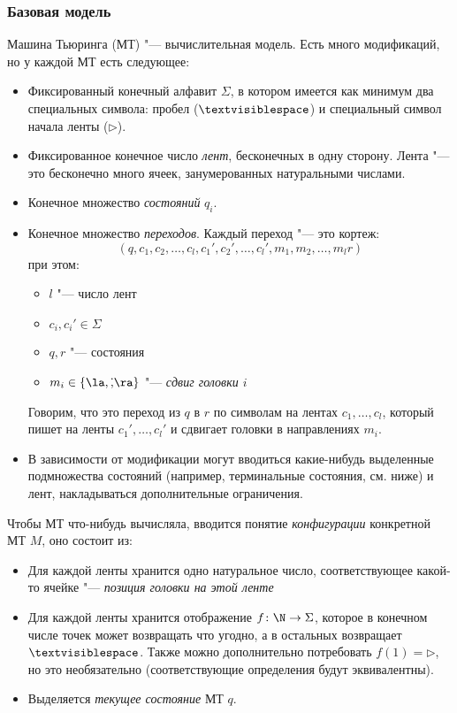 \subsubsection{Базовая модель}
	Машина Тьюринга (МТ) "--- вычислительная модель.
	Есть много модификаций, но у каждой МТ есть следующее:
	\begin{itemize}
		\item
			Фиксированный конечный алфавит $\Sigma$, в котором имеется как минимум два специальных символа: пробел ($\textvisiblespace$) и
			специальный символ начала ленты ($\triangleright$).
		\item
			Фиксированное конечное число \textit{лент}, бесконечных в одну сторону.
			Лента "--- это бесконечно много ячеек, занумерованных натуральными числами.
		\item Конечное множество \textit{состояний} $q_i$.
		\item Конечное множество \textit{переходов}.
			Каждый переход "--- это кортеж:
			\[ (q, c_1, c_2, \dots, c_l, c_1', c_2', \dots, c_l', m_1, m_2, \dots, m_l r) \]
			при этом:
			\begin{itemize}
				\item $l$ "--- число лент
				\item $c_i, c_i' \in \Sigma$
				\item $q, r$ "--- состояния
				\item $m_i \in \{\la, \dot, \ra\}$ "--- \textit{сдвиг головки $i$}
			\end{itemize}
			Говорим, что это переход из $q$ в $r$ по символам на лентах $c_1, \dots, c_l$, который пишет на ленты $c_1', \dots, c_l'$
			и сдвигает головки в направлениях $m_i$.
		\item В зависимости от модификации могут вводиться какие-нибудь выделенные подмножества состояний (например, терминальные состояния, см. ниже) и лент, накладываться дополнительные ограничения.
	\end{itemize}
	Чтобы МТ что-нибудь вычисляла, вводится понятие \textit{конфигурации} конкретной МТ $M$, оно состоит из:
	\begin{itemize}
		\item Для каждой ленты хранится одно натуральное число, соответствующее какой-то ячейке "--- \textit{позиция головки на этой ленте}
		\item
			Для каждой ленты хранится отображение $f \colon \N \to \Sigma$, которое в конечном числе точек может возвращать что угодно, а в остальных возвращает $\textvisiblespace$.
			Также можно дополнительно потребовать $f(1)=\triangleright$, но это необязательно (соответствующие определения будут эквивалентны).
		\item
			Выделяется \textit{текущее состояние} МТ $q$.
	\end{itemize}
